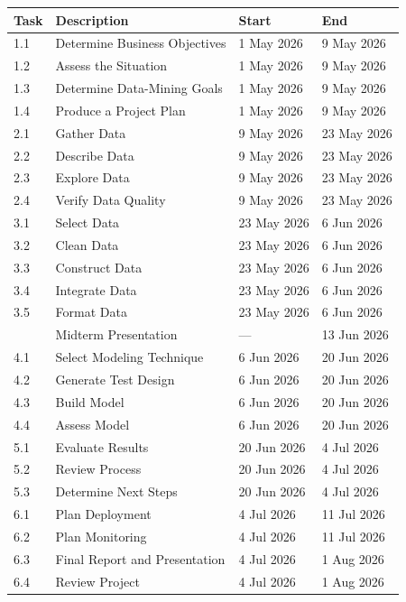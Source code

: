 {\renewcommand{\arraystretch}{0.75}
\begin{tabular}{lp{6.5cm}ll}
\hline
\textbf{Task} & \textbf{Description} & \textbf{Start} & \textbf{End} \\
\hline
1.1 & Determine Business Objectives  & 1 May 2026 & 9 May 2026  \\
1.2 & Assess the Situation           & 1 May 2026 & 9 May 2026  \\
1.3 & Determine Data-Mining Goals    & 1 May 2026 & 9 May 2026  \\
1.4 & Produce a Project Plan         & 1 May 2026 & 9 May 2026  \\
\hline
2.1 & Gather Data                    & 9 May 2026  & 23 May 2026 \\
2.2 & Describe Data                  & 9 May 2026  & 23 May 2026 \\
2.3 & Explore Data                   & 9 May 2026  & 23 May 2026 \\
2.4 & Verify Data Quality            & 9 May 2026  & 23 May 2026 \\
\hline
3.1 & Select Data                    & 23 May 2026 & 6 Jun 2026  \\
3.2 & Clean Data                     & 23 May 2026 & 6 Jun 2026  \\
3.3 & Construct Data                 & 23 May 2026 & 6 Jun 2026  \\
3.4 & Integrate Data                 & 23 May 2026 & 6 Jun 2026  \\
3.5 & Format Data                    & 23 May 2026 & 6 Jun 2026  \\
\hline
    & Midterm Presentation           & —           & 13 Jun 2026 \\
\hline
4.1 & Select Modeling Technique      & 6 Jun 2026  & 20 Jun 2026 \\
4.2 & Generate Test Design           & 6 Jun 2026  & 20 Jun 2026 \\
4.3 & Build Model                    & 6 Jun 2026  & 20 Jun 2026 \\
4.4 & Assess Model                   & 6 Jun 2026  & 20 Jun 2026 \\
\hline
5.1 & Evaluate Results               & 20 Jun 2026 & 4 Jul 2026  \\
5.2 & Review Process                 & 20 Jun 2026 & 4 Jul 2026  \\
5.3 & Determine Next Steps           & 20 Jun 2026 & 4 Jul 2026  \\
\hline
6.1 & Plan Deployment                & 4 Jul 2026  & 11 Jul 2026 \\
6.2 & Plan Monitoring                & 4 Jul 2026  & 11 Jul 2026 \\
6.3 & Final Report and Presentation  & 4 Jul 2026  & 1 Aug 2026  \\
6.4 & Review Project                 & 4 Jul 2026  & 1 Aug 2026  \\
\hline
\end{tabular}
}%
